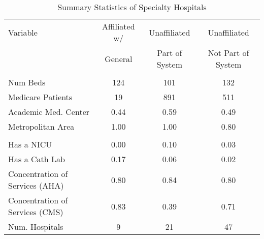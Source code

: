 \begin{table}[ht!]

\caption{Summary Statistics of Specialty Hospitals\label{tab:hospital_specialty_summarystats}}
\centering
\begin{tabular}[t]{lccc}
\toprule
Variable & Affiliated w/ & Unaffiliated & Unaffiliated\\
 & General & Part of System & Not Part of System\\
\midrule
\addlinespace[0.3em]
\multicolumn{4}{l}{\textbf{Characteristics}}\\
\hspace{1em}Num Beds & 124 & 101 & 132\\
\hspace{1em}Medicare Patients & 19 & 891 & 511\\
\hspace{1em}Academic Med. Center & 0.44 & 0.59 & 0.49\\
\hspace{1em}Metropolitan Area & 1.00 & 1.00 & 0.80\\
\addlinespace[0.3em]
\multicolumn{4}{l}{\textbf{Services}}\\
\hspace{1em}Has a NICU & 0.00 & 0.10 & 0.03\\
\hspace{1em}Has a Cath Lab & 0.17 & 0.06 & 0.02\\
\hspace{1em}Concentration of Services (AHA) & 0.80 & 0.84 & 0.80\\
\hspace{1em}Concentration of Services (CMS) & 0.83 & 0.39 & 0.71\\
\addlinespace[0.3em]
Num. Hospitals & 9 & 21 & 47\\
\bottomrule
\end{tabular}
\end{table}
